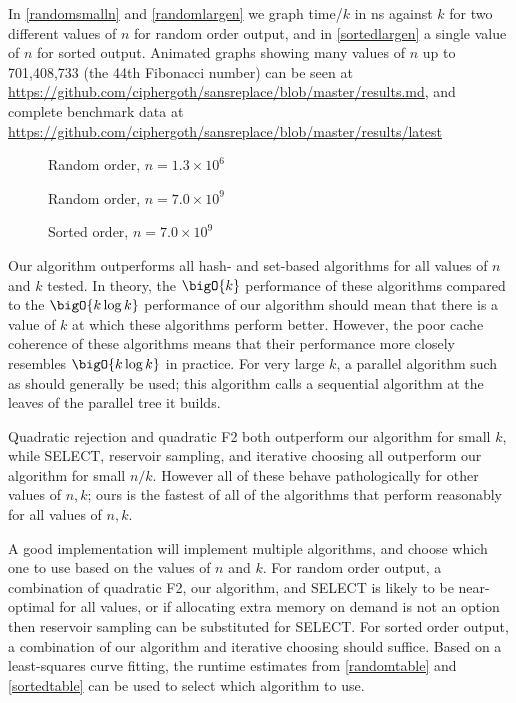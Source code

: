 \documentclass[letterpaper,luatex,11pt]{article}
\begin{document}
In \autoref{randomsmalln} and \autoref{randomlargen} we graph
time/\(k\) in ns against \(k\) for two different values of \(n\) for
random order output, and in \autoref{sortedlargen} a single value of
\(n\) for sorted output. Animated graphs showing many values of \(n\)
up to 701,408,733 (the 44th Fibonacci number) can be seen at
\url{https://github.com/ciphergoth/sansreplace/blob/master/results.md},
and complete benchmark data at
\url{https://github.com/ciphergoth/sansreplace/blob/master/results/latest}

\begin{figure}
    
    \caption{Random order, \(n=1.3 \times 10^{6}\)}
    \label{randomsmalln}
\end{figure}

\begin{figure}
    
    \caption{Random order, \(n=7.0 \times 10^{9}\)}
    \label{randomlargen}
\end{figure}

\begin{figure}
    
    \caption{Sorted order, \(n=7.0 \times 10^{9}\)}
    \label{sortedlargen}
\end{figure}

Our algorithm outperforms all hash- and set-based algorithms for all
values of \(n\) and \(k\) tested. In theory, the \(\bigO{k}\)
performance of these algorithms compared to the \(\bigO{k \log k}\)
performance of our algorithm should mean that there is a value of
\(k\) at which these algorithms perform better. However, the poor
cache coherence of these algorithms means that their performance more
closely resembles \(\bigO{k \log k}\) in practice. For very large
\(k\), a parallel algorithm such as \cite{sandersetal} should
generally be used; this algorithm calls a sequential algorithm at the
leaves of the parallel tree it builds.

Quadratic rejection and quadratic F2 both outperform our algorithm for
small \(k\), while SELECT, reservoir sampling, and iterative choosing
all outperform our algorithm for small \(n/k\). However all of these
behave pathologically for other values of \(n, k\); ours is the
fastest of all of the algorithms that perform reasonably for all
values of \(n, k\).

A good implementation will implement multiple algorithms, and choose
which one to use based on the values of \(n\) and \(k\). For random
order output, a combination of quadratic F2, our algorithm, and SELECT
is likely to be near-optimal for all values, or if allocating extra
memory on demand is not an option then reservoir sampling can be
substituted for SELECT. For sorted order output, a combination of our
algorithm and iterative choosing should suffice. Based on a
least-squares curve fitting, the runtime estimates from
\autoref{randomtable} and \autoref{sortedtable} can be used to select
which algorithm to use.
\end{document}
